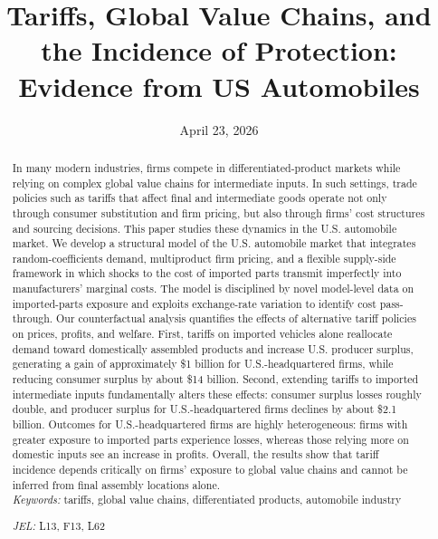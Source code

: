 \documentclass[11pt]{article}
\title{\textbf{Tariffs, Global Value Chains, and the Incidence of Protection: Evidence from US Automobiles}\vspace{20pt}}
\begin{document}
\date{\medskip{} April 23, 2026}
\maketitle

\begin{abstract}

\footnotesize
\singlespacing
{}

\noindent

\noindent In many modern industries, firms compete in differentiated-product markets while relying on complex global value chains for intermediate inputs. In such settings, trade policies such as tariffs that affect final and intermediate goods operate not only through consumer substitution and firm pricing, but also through firms’ cost structures and sourcing decisions. This paper studies these dynamics in the U.S. automobile market. We develop a structural model of the U.S. automobile market that integrates random-coefficients demand, multiproduct firm pricing, and a flexible supply-side framework in which shocks to the cost of imported parts transmit imperfectly into manufacturers’ marginal costs. The model is disciplined by novel model-level data on imported-parts exposure and exploits exchange-rate variation to identify cost pass-through. Our counterfactual analysis quantifies the effects of alternative tariff policies on prices, profits, and welfare. First, tariffs on imported vehicles alone reallocate demand toward domestically assembled products and increase U.S. producer surplus, generating a gain of approximately \$1 billion for U.S.-headquartered firms, while reducing consumer surplus by about \$14 billion. Second, extending tariffs to imported intermediate inputs fundamentally alters these effects: consumer surplus losses roughly double, and producer surplus for U.S.-headquartered firms declines by about \$2.1 billion. Outcomes for U.S.-headquartered firms are highly heterogeneous: firms with greater exposure to imported parts experience losses, whereas those relying more on domestic inputs see an increase in profits. Overall, the results show that tariff incidence depends critically on firms’ exposure to global value chains and cannot be inferred from final assembly locations alone.
\bigskip
\\
\noindent \textit{Keywords:} tariffs, global value chains, differentiated products, automobile industry

\bigskip\noindent \textit{JEL:} L13, F13, L62
\end{abstract}
\end{document}
